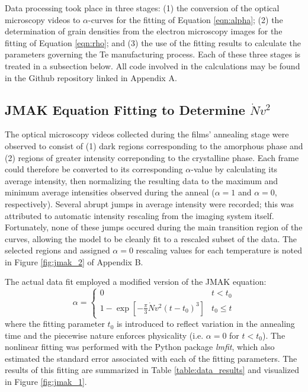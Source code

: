 Data processing took place in three stages: (1) the conversion of the optical microscopy videos to $\alpha$-curves for the fitting of Equation \ref{eqn:alpha}; (2) the determination of grain densities from the electron microscopy images for the fitting of Equation \ref{eqn:rho}; and (3) the use of the fitting results to calculate the parameters governing the Te manufacturing process.  Each of these three stages is treated in a subsection below.  All code involved in the calculations may be found in the Github repository linked in Appendix A.

\subsection{JMAK Equation Fitting to Determine $\dot{N}v^2$}

The optical microscopy videos collected during the films' annealing stage were observed to consist of (1) dark regions corresponding to the amorphous phase and (2) regions of greater intensity correponding to the crystalline phase.  Each frame could therefore be converted to its corresponding $\alpha$-value by calculating its average intensity, then normalizing the resulting data to the maximum and minimum average intensities observed during the anneal ($\alpha = 1$ and $\alpha = 0$, respectively).  Several abrupt jumps in average intensity were recorded; this was attributed to automatic intensity rescaling from the imaging system itself.  Fortunately, none of these jumps occured during the main transition region of the curves, allowing the model to be cleanly fit to a rescaled subset of the data.  The selected regions and assigned $\alpha = 0$ rescaling values for each temperature is noted in Figure \ref{fig:jmak_2} of Appendix B.

The actual data fit employed a modified version of the JMAK equation:
%
	\begin{equation}
	\alpha =
	\begin{cases}
		0 & t < t_0 \\
		1 - \exp \left[ -\frac{\pi}{3} \dot{N} v^2 (t-t_0)^3 
			\right] & t_0 \leq t
	\end{cases}
	\label{eqn:jmak_modified}
	\end{equation}
%
where the fitting parameter $t_0$ is introduced to reflect variation in the annealing time \cite{chrzan:2020} and the piecewise nature enforces physicality (i.e. $\alpha = 0$ for $t < t_0$).  The nonlinear fitting was performed with the Python package \textit{lmfit}, which also estimated the standard error associated with each of the fitting parameters.\cite{lmfit}  The results of this fitting are summarized in Table \ref{table:data_results} and visualized in Figure \ref{fig:jmak_1}.
	

